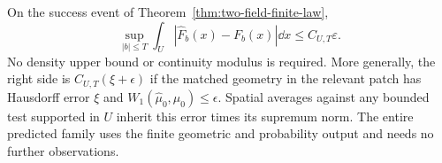 \begin{corollary}
\label{cor:two-field-finite-prediction}
On the success event of Theorem~\ref{thm:two-field-finite-law},
\begin{equation}\label{eq:two-field-prediction-Lone}
 \sup_{|b|\le T}\int_U
             |\widehat F_b(x)-F_b(x)|\dd x
                         \le C_{U,T}\varepsilon.
\end{equation}
No density upper bound or continuity modulus is required.  More
generally, the right side is $C_{U,T}(\xi+\epsilon)$ if the
matched geometry in the relevant patch has Hausdorff error $\xi$
and $W_1(\widehat\mu_0,\mu_0)\le\epsilon$.  Spatial averages
against any bounded test supported in $U$ inherit this error times
its supremum norm.  The entire predicted family uses the finite
geometric and probability output and needs no further observations.
\end{corollary}
